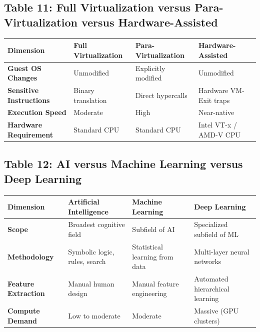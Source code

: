 \subsection*{Table 11: Full Virtualization versus Para-Virtualization versus Hardware-Assisted}
\begin{center}
\small
\begin{tabularx}{\textwidth}{lXXX}
\toprule
\textbf{Dimension} & \textbf{Full Virtualization} & \textbf{Para-Virtualization} & \textbf{Hardware-Assisted} \\
\midrule
\textbf{Guest OS Changes} & Unmodified & Explicitly modified & Unmodified \\
\textbf{Sensitive Instructions} & Binary translation & Direct hypercalls & Hardware VM-Exit traps \\
\textbf{Execution Speed} & Moderate & High & Near-native \\
\textbf{Hardware Requirement} & Standard CPU & Standard CPU & Intel VT-x / AMD-V CPU \\
\bottomrule
\end{tabularx}
\end{center}

\subsection*{Table 12: AI versus Machine Learning versus Deep Learning}
\begin{center}
\small
\begin{tabularx}{\textwidth}{lXXX}
\toprule
\textbf{Dimension} & \textbf{Artificial Intelligence} & \textbf{Machine Learning} & \textbf{Deep Learning} \\
\midrule
\textbf{Scope} & Broadest cognitive field & Subfield of AI & Specialized subfield of ML \\
\textbf{Methodology} & Symbolic logic, rules, search & Statistical learning from data & Multi-layer neural networks \\
\textbf{Feature Extraction} & Manual human design & Manual feature engineering & Automated hierarchical learning \\
\textbf{Compute Demand} & Low to moderate & Moderate & Massive (GPU clusters) \\
\bottomrule
\end{tabularx}
\end{center}

